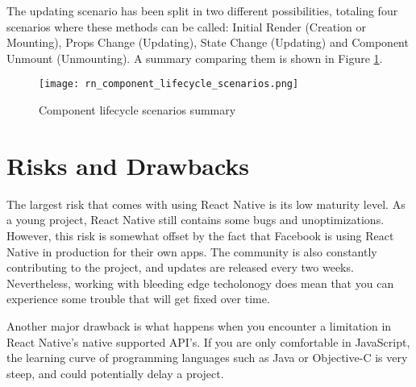 The updating scenario has been split in two different possibilities, totaling four scenarios where these methods can be called: Initial Render (Creation or Mounting), Props Change (Updating), State Change (Updating) and Component Unmount (Unmounting). A summary comparing them is shown in Figure \ref{fig:rncomplifescenarios}.

\begin{figure}[H]
	\centering
	\texttt{[image: rn\_component\_lifecycle\_scenarios.png]}
	\caption{Component lifecycle scenarios summary\label{fig:rncomplifescenarios}}
\end{figure}

\section{Risks and Drawbacks}

The largest risk that comes with using React Native is its low maturity level. As a young project, React Native still contains some bugs and unoptimizations. However, this risk is somewhat offset by the fact that Facebook is using React Native in production for their own apps. The community is also constantly contributing to the project, and updates are released every two weeks. Nevertheless, working with bleeding edge techolonogy does mean that you can experience some trouble that will get fixed over time.

Another major drawback is what happens when you encounter a limitation in React Native's native supported API's. If you are only comfortable in JavaScript, the learning curve of programming languages such as Java or Objective-C is very steep, and could potentially delay a project.